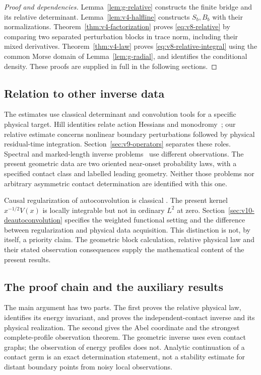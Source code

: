 \begin{proof}[Proof and dependencies]
Lemma~\ref{lem:g-relative} constructs the finite bridge and its relative
determinant. Lemma~\ref{lem:v4-halfline} constructs $S_b,B_b$ with their
normalizations. Theorem~\ref{thm:v4-factorization} proves
\eqref{eq:v8-relative} by comparing two separated perturbation blocks in
trace norm, including their mixed derivatives. Theorem~\ref{thm:v4-law}
proves \eqref{eq:v8-relative-integral} using the common Morse domain of
Lemma~\ref{lem:g-radial}, and identifies the conditional density.
These proofs are supplied in full in the following sections.
\end{proof}


\subsection{Relation to other inverse data}
The estimates use classical determinant and convolution tools for a
specific physical target. Hill identities relate action Hessians and
monodromy~\cite{Hill}; our relative estimate concerns nonlinear
boundary perturbations followed by physical residual-time integration.
Section~\ref{sec:v9-operators} separates these roles. Spectral and
marked-length inverse problems~\cite{Zelditch,DSKL,FinamoreLeguil}
use different observations. The present geometric data are two
oriented near-onset probability laws, with a specified contact class
and labelled leading geometry. Neither those problems nor arbitrary
asymmetric contact determination are identified with this one.

Causal regularization of autoconvolution is classical
\cite{DaiLamm,HofmannWernerDeng}. The present kernel
$x^{-1/2}V(x)$ is locally integrable but not in ordinary $L^2$ at
zero. Section~\ref{sec:v10-deautoconvolution} specifies the weighted
functional setting and the difference between regularization and
physical data acquisition. This distinction is not, by itself, a
priority claim. The geometric block calculation, relative physical
law and their stated observation consequences supply the mathematical
content of the present results.

\subsection{The proof chain and the auxiliary results}
The main argument has two parts. The first proves the relative physical
law, identifies its energy invariant, and proves the independent-contact
inverse and its physical realization. The second gives the Abel
coordinate and the strongest complete-profile observation theorem.
The geometric inverse uses even contact graphs; the observation of
energy profiles does not. Analytic continuation of a contact germ is
an exact determination statement, not a stability estimate for distant
boundary points from noisy local observations.

